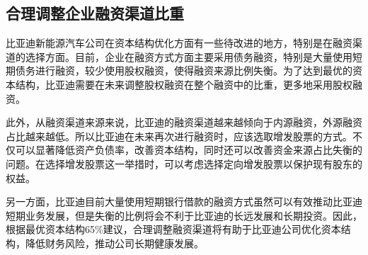 \subsection{合理调整企业融资渠道比重}
比亚迪新能源汽车公司在资本结构优化方面有一些待改进的地方，特别是在融资渠道的选择方面。目前，企业在融资方式方面主要采用债务融资，特别是大量使用短期债务进行融资，较少使用股权融资，使得融资来源比例失衡。为了达到最优的资本结构，比亚迪需要在未来调整股权融资在整个融资中的比重，更多地采用股权融资。

此外，从融资渠道来源来说，比亚迪的融资渠道越来越倾向于内源融资，外源融资占比越来越低。所以比亚迪在未来再次进行融资时，应该选取增发股票的方式。不仅可以显著降低资产负债率，改善资本结构，同时还可以改善资金来源占比失衡的问题。在选择增发股票这一举措时，可以考虑选择定向增发股票以保护现有股东的权益。 

另一方面，比亚迪目前大量使用短期银行借款的融资方式虽然可以有效推动比亚迪短期业务发展，但是失衡的比例将会不利于比亚迪的长远发展和长期投资。因此，根据最优资本结构65\%建议，合理调整融资渠道将有助于比亚迪公司优化资本结构，降低财务风险，推动公司长期健康发展。
